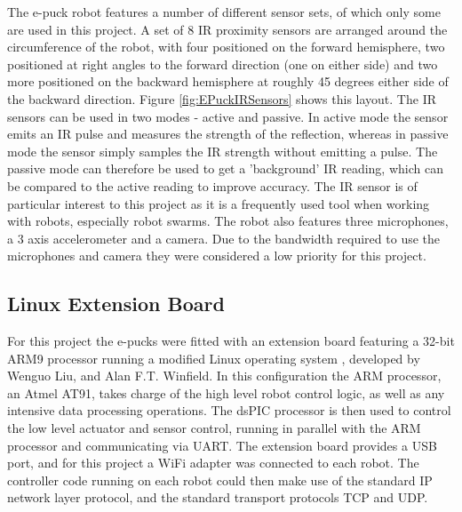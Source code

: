 The e-puck robot features a number of different sensor sets, of which only some are used in this project. A set of 8 IR proximity sensors are arranged around the circumference of the robot, with four positioned on the forward hemisphere, two positioned at right angles to the forward direction (one on either side) and two more positioned on the backward hemisphere at roughly 45 degrees either side of the backward direction. Figure \ref{fig:EPuckIRSensors} shows this layout. The IR sensors can be used in two modes - active and passive. In active mode the sensor emits an IR pulse and measures the strength of the reflection, whereas in passive mode the sensor simply samples the IR strength without emitting a pulse. The passive mode can therefore be used to get a 'background' IR reading, which can be compared to the active reading to improve accuracy. The IR sensor is of particular interest to this project as it is a frequently used tool when working with robots, especially robot swarms. The robot also features three microphones, a 3 axis accelerometer and a camera. Due to the bandwidth required to use the microphones and camera they were considered a low priority for this project.


\subsection{Linux Extension Board} \label{LinuxExtensionBoard}
For this project the e-pucks were fitted with an extension board featuring a 32-bit ARM9 processor running a modified Linux operating system \cite{LinuxExtensionBoard}, developed by Wenguo Liu, and Alan F.T. Winfield. In this configuration the ARM processor, an Atmel AT91, takes charge of the high level robot control logic, as well as any intensive data processing operations. The dsPIC processor is then used to control the low level actuator and sensor control, running in parallel with the ARM processor and communicating via UART. The extension board provides a USB port, and for this project a WiFi adapter was connected to each robot. The controller code running on each robot could then make use of the standard IP network layer protocol, and the standard transport protocols TCP and UDP.



